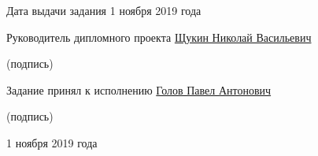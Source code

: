 \hfill \break
\noindent
Дата выдачи задания 1 ноября 2019 года

\hfill \break
\noindent
Руководитель дипломного проекта \underline{\hspace{2.5cm}} \uline{Щукин Николай Васильевич}

\scriptsize \hspace{7.5cm} (подпись)

\hfill \break
\noindent
\normalsize
Задание принял к исполнению \hspace{0.9cm} \underline{\hspace{2.5cm}} \uline{Голов Павел Антонович}

\scriptsize \hspace{7.5cm} (подпись)

\hfill \break
\noindent
\normalsize
1 ноября 2019 года

\normalsize
\clearpage
